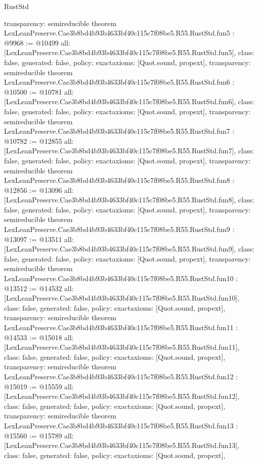 \begin{lexlean}{RustStd}
\begin{coremodule}
{  transparency: semireducible
}
theorem LexLeanPreserve.Cae3b8bd4b93b4633bf40c115c7f08be5.R55.RustStd.fun5 : @9968 := @10499 {
  all: [LexLeanPreserve.Cae3b8bd4b93b4633bf40c115c7f08be5.R55.RustStd.fun5],
  class: false,
  generated: false,
  policy: exact{axioms: [Quot.sound, propext]},
  transparency: semireducible
}
theorem LexLeanPreserve.Cae3b8bd4b93b4633bf40c115c7f08be5.R55.RustStd.fun6 : @10500 := @10781 {
  all: [LexLeanPreserve.Cae3b8bd4b93b4633bf40c115c7f08be5.R55.RustStd.fun6],
  class: false,
  generated: false,
  policy: exact{axioms: [Quot.sound, propext]},
  transparency: semireducible
}
theorem LexLeanPreserve.Cae3b8bd4b93b4633bf40c115c7f08be5.R55.RustStd.fun7 : @10782 := @12855 {
  all: [LexLeanPreserve.Cae3b8bd4b93b4633bf40c115c7f08be5.R55.RustStd.fun7],
  class: false,
  generated: false,
  policy: exact{axioms: [Quot.sound, propext]},
  transparency: semireducible
}
theorem LexLeanPreserve.Cae3b8bd4b93b4633bf40c115c7f08be5.R55.RustStd.fun8 : @12856 := @13096 {
  all: [LexLeanPreserve.Cae3b8bd4b93b4633bf40c115c7f08be5.R55.RustStd.fun8],
  class: false,
  generated: false,
  policy: exact{axioms: [Quot.sound, propext]},
  transparency: semireducible
}
theorem LexLeanPreserve.Cae3b8bd4b93b4633bf40c115c7f08be5.R55.RustStd.fun9 : @13097 := @13511 {
  all: [LexLeanPreserve.Cae3b8bd4b93b4633bf40c115c7f08be5.R55.RustStd.fun9],
  class: false,
  generated: false,
  policy: exact{axioms: [Quot.sound, propext]},
  transparency: semireducible
}
theorem LexLeanPreserve.Cae3b8bd4b93b4633bf40c115c7f08be5.R55.RustStd.fun10 : @13512 := @14532 {
  all: [LexLeanPreserve.Cae3b8bd4b93b4633bf40c115c7f08be5.R55.RustStd.fun10],
  class: false,
  generated: false,
  policy: exact{axioms: [Quot.sound, propext]},
  transparency: semireducible
}
theorem LexLeanPreserve.Cae3b8bd4b93b4633bf40c115c7f08be5.R55.RustStd.fun11 : @14533 := @15018 {
  all: [LexLeanPreserve.Cae3b8bd4b93b4633bf40c115c7f08be5.R55.RustStd.fun11],
  class: false,
  generated: false,
  policy: exact{axioms: [Quot.sound, propext]},
  transparency: semireducible
}
theorem LexLeanPreserve.Cae3b8bd4b93b4633bf40c115c7f08be5.R55.RustStd.fun12 : @15019 := @15559 {
  all: [LexLeanPreserve.Cae3b8bd4b93b4633bf40c115c7f08be5.R55.RustStd.fun12],
  class: false,
  generated: false,
  policy: exact{axioms: [Quot.sound, propext]},
  transparency: semireducible
}
theorem LexLeanPreserve.Cae3b8bd4b93b4633bf40c115c7f08be5.R55.RustStd.fun13 : @15560 := @15789 {
  all: [LexLeanPreserve.Cae3b8bd4b93b4633bf40c115c7f08be5.R55.RustStd.fun13],
  class: false,
  generated: false,
  policy: exact{axioms: [Quot.sound, propext]},
}
\end{coremodule}
\end{lexlean}
